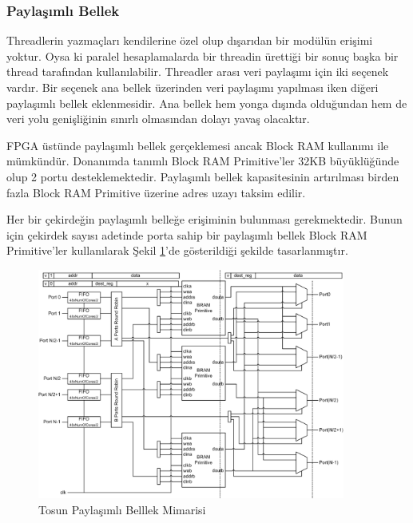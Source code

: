 \subsubsection{Paylaşımlı Bellek}
Threadlerin yazmaçları kendilerine özel olup dışarıdan bir modülün erişimi yoktur. Oysa ki paralel hesaplamalarda bir threadin ürettiği bir sonuç başka bir thread tarafından kullanılabilir. Threadler arası veri paylaşımı için iki seçenek vardır. Bir seçenek ana bellek üzerinden veri paylaşımı yapılması iken diğeri paylaşımlı bellek eklenmesidir. Ana bellek hem yonga dışında olduğundan hem de veri yolu genişliğinin sınırlı olmasından dolayı yavaş olacaktır.\par
FPGA üstünde paylaşımlı bellek gerçeklemesi ancak Block RAM kullanımı ile mümkündür. Donanımda tanımlı Block RAM Primitive'ler 32KB büyüklüğünde olup 2 portu desteklemektedir. Paylaşımlı bellek kapasitesinin artırılması birden fazla Block RAM Primitive üzerine adres uzayı taksim edilir.\par
Her bir çekirdeğin paylaşımlı belleğe erişiminin bulunması gerekmektedir. Bunun için çekirdek sayısı adetinde porta sahip bir paylaşımlı bellek Block RAM Primitive'ler kullanılarak Şekil \ref{image:sharedMemory}'de gösterildiği şekilde tasarlanmıştır.
\begin{figure}[ht]
\centering
\shorthandoff{=}
\includegraphics[width=0.9\textwidth]{gorsel/sharedMemory.png}
\shorthandoff{=}
\caption{Tosun Paylaşımlı Belllek Mimarisi}
\label{image:sharedMemory}
\end{figure}

